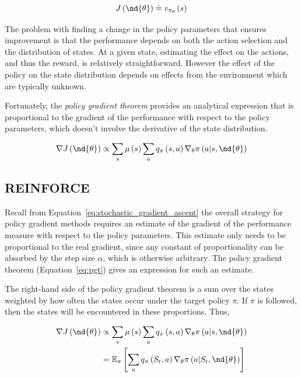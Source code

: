 \begin{equation}
  J\left(\nd{\theta}\right) \doteq v_{\pi_\theta}\left(s\right)
\end{equation}

The problem with finding a change in the policy parameters that ensures improvement is that the performance depends on both the action selection and the distribution of states. At a given state, estimating the effect on the actions, and thus the reward, is relatively straightforward. However the effect of the policy on the state distribution depends on effects from the environment which are typically unknown.

Fortunately, the \emph{policy gradient theorem} provides an analytical expression that is proportional to the gradient of the performance with respect to the policy parameters, which doesn't involve the derivative of the state distribution\cite{sutton2018reinforcement}.

\begin{equation}
  \nabla J\left(\nd{\theta}\right) \propto \sum_s \mu \left(s\right) \sum_a q_\pi\left(s, a\right) \nabla_\theta \pi\left(a|s, \nd{\theta}\right)
  \label{eq:pgt}
\end{equation}

\subsection{REINFORCE}
Recall from Equation~\ref{eq:stochastic_gradient_ascent} the overall strategy for policy gradient methods requires an estimate of the gradient of the performance measure with respect to the policy parameters. This estimate only needs to be proportional to the real gradient, since any constant of proportionality can be absorbed by the step size $\alpha$, which is otherwise arbitrary. The policy gradient theorem (Equation~\ref{eq:pgt}) gives an expression for such an estimate.

The right-hand side of the policy gradient theorem is a sum over the states weighted by how often the states occur under the target policy $\pi$. If $\pi$ is followed, then the states will be encountered in these proportions. Thus,

\begin{align}
  \nabla J\left(\nd{\theta}\right) &\propto \sum_s \mu \left(s\right) \sum_a q_\pi\left(s, a\right) \nabla_\theta \pi\left(a|s, \nd{\theta}\right)\\
  &= \mathbb{E}_\pi\left[\sum_a q_\pi\left(S_t, a\right) \nabla_\theta \pi\left(a|S_t, \nd{\theta}\right)\right]
\end{align}

